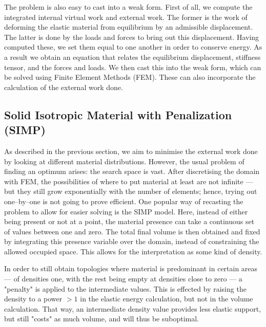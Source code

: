 The problem is also easy to cast into a weak form. First of all, we compute the integrated internal virtual work and external work. The former is the work of deforming the elastic material from equilibrium by an admissible displacement. The latter is done by the loads and forces to bring out this displacement. Having computed these, we set them equal to one another in order to conserve energy. As a result we obtain an equation that relates the equilibrium displacement, stiffness tensor, and the forces and loads. We then cast this into the weak form, which can be solved using Finite Element Methods (FEM). These can also incorporate the calculation of the external work done.

\subsection{Solid Isotropic Material with Penalization (SIMP)}
As described in the previous section, we aim to minimise the external work done by looking at different material distributions. However, the usual problem of finding an optimum arises: the search space is vast. After discretising the domain with FEM, the possibilities of where to put material at least are not infinite --- but they still grow exponentially with the number of elements; hence, trying out one--by--one is not going to prove efficient. One popular way of recasting the problem to allow for easier solving is the SIMP model. Here, instead of either being present or not at a point, the material presence can take a continuous set of values between one and zero. The total final volume is then obtained and fixed by integrating this presence variable over the domain, instead of constraining the allowed occupied space. This allows for the interpretation as some kind of density.

In order to still obtain topologies where material is predominant in certain areas --- of densities one, with the rest being empty at densities close to zero --- a "penalty" is applied to the intermediate values. This is effected by raising the density to a power $> 1$ in the elastic energy calculation, but not in the volume calculation. That way, an intermediate density value provides less elastic support, but still "costs" as much volume, and will thus be suboptimal. 

